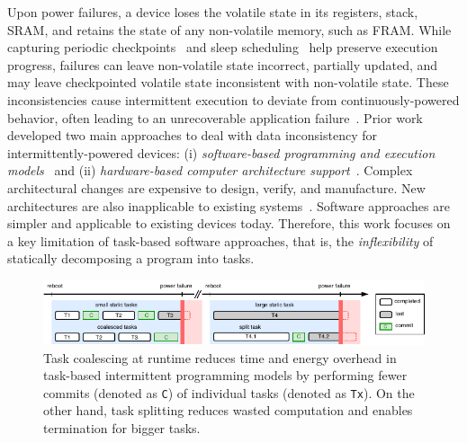 Upon power failures, a device loses the volatile
state in its registers, stack, SRAM, and retains the state of any non-volatile
memory, such as FRAM. While capturing periodic
checkpoints~\cite{mementos,quickrecall} and sleep
scheduling~\cite{dewdrop,hibernus,hibernusplusplus} help preserve execution
progress, failures can leave non-volatile state incorrect, partially updated,
and may leave checkpointed volatile state inconsistent with non-volatile state.
These inconsistencies cause intermittent execution to deviate from
continuously-powered behavior, often leading to an unrecoverable
application failure~\cite{dino,edb}. Prior work developed two main approaches to deal with data inconsistency for
intermittently-powered devices: (i) \emph{software-based programming and
execution models}~\cite{dino,ratchet,chain,alpaca} and (ii)
\emph{hardware-based computer architecture
support}~\cite{hicks_isca_2017,idetic,nvp}. Complex architectural changes are
expensive to design, verify, and manufacture. New architectures are also
inapplicable to existing systems~\cite{hicks_isca_2017,nvp}. Software
approaches are simpler and applicable to existing devices today. Therefore, this work focuses on a key limitation of task-based software approaches, that is, the {\em inflexibility} of statically decomposing a program into tasks.

%
\begin{figure}
    \centering
    \includegraphics[width=\columnwidth]{figures/intro-figure-horiz.pdf}
    \caption{Task coalescing at runtime reduces time and energy overhead in task-based intermittent programming models by performing fewer commits (denoted as \texttt{C}) of individual tasks (denoted as \texttt{Tx}). On the other hand, task splitting reduces wasted computation and enables termination for bigger tasks.}
    \label{fig:coalesce}
\end{figure}
%

